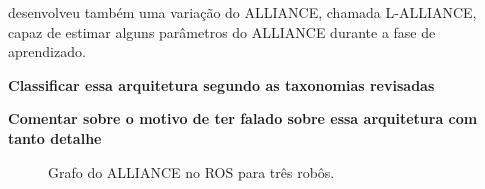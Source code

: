          desenvolveu também uma variação do ALLIANCE, chamada L-ALLIANCE, capaz de estimar alguns parâmetros do ALLIANCE durante a fase de aprendizado.
        
        \textbf{\color{red} Classificar essa arquitetura segundo as taxonomias revisadas}
        
        \textbf{\color{red} Comentar sobre o motivo de ter falado sobre essa arquitetura com tanto detalhe}
        
        
        
        \begin{figure}[htb]
            \centering
            \resizebox{0.95\textwidth}{!}{}
            \caption{Grafo do ALLIANCE no ROS para três robôs.} \label{fig:rosgraph_alliance}
        \end{figure}
